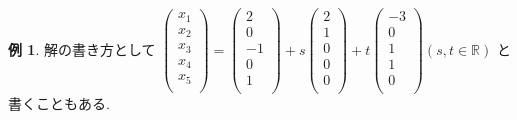 \documentclass[dvipdfmx,a4paper,11pt]{article}
\newcommand{\R}{\mathbb{R}}
\theoremstyle{definition}
\newtheorem{exa}[thm]{例}
\begin{document}
\begin{exa}
解の書き方として
$
\begin{pmatrix}
x_1\\
x_2 \\
x_3 \\
x_4 \\
x_5 \\
\end{pmatrix}
=
\begin{pmatrix}
2\\
0 \\
-1 \\
0\\
1 \\
\end{pmatrix}
+ s
\begin{pmatrix}
2\\
1\\
0\\
0\\
0 \\
\end{pmatrix}
+ t
\begin{pmatrix}
-3\\
0\\
1\\
1\\
0 \\
\end{pmatrix}
(s, t \in \R)
$
と書くこともある.
 \end{exa}
 
\end{document}
